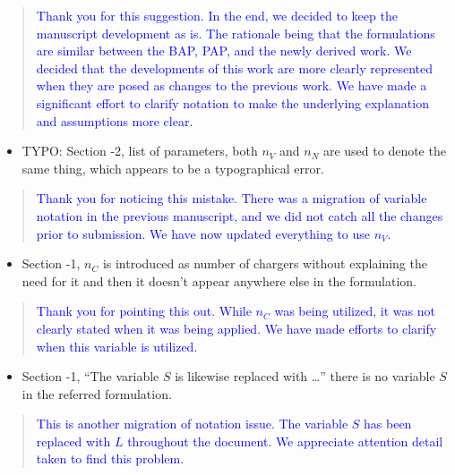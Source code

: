 \documentclass[11pt,a4paper,final]{article}
\begin{document}
\begin{quote}
\textcolor{blue}{Thank you for this suggestion. In the end, we decided to keep the manuscript development as is. The rationale being that the formulations are similar between the BAP, PAP, and the newly derived work. We decided that the developments of this work are more clearly represented when they are posed as changes to the previous work. We have made a significant effort to clarify notation to make the underlying explanation and assumptions more clear.}
\end{quote}

\begin{itemize}
\item TYPO: Section -2, list of parameters, both \(n_V\) and \(n_N\) are used to denote the same thing, which appears to be a typographical error.
\end{itemize}

\begin{quote}
\textcolor{blue}{Thank you for noticing this mistake. There was a migration of variable notation in the previous manuscript, and we did not catch all the changes prior to submission. We have now updated everything to use $n_V$.}
\end{quote}

\begin{itemize}
\item Section -1, \(n_C\) is introduced as number of chargers without explaining the need for it and then it doesn’t appear anywhere else in the formulation.
\end{itemize}

\begin{quote}
\textcolor{blue}{Thank you for pointing this out. While $n_C$ was being utilized, it was not clearly stated when it was being applied. We have made efforts to clarify when this variable is utilized.}
\end{quote}

\begin{itemize}
\item Section -1, “The variable \(S\) is likewise replaced with …” there is no variable \(S\) in the referred formulation.
\end{itemize}

\begin{quote}
\textcolor{blue}{This is another migration of notation issue. The variable $S$ has been replaced with $L$ throughout the document. We appreciate attention detail taken to find this problem.}
\end{quote}
\end{document}
